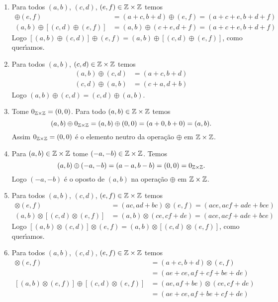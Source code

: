 \documentclass[12pt]{article}
\begin{document}
	\begin{enumerate}[label={\roman*})]
		\item Para todos $(a, b)$, $(c, d)$, $(e, f) \in \mathbb{Z} \times \mathbb{Z}$ temos
		\begin{align*}
			[(a, b) \oplus (c, d)] \oplus (e, f) &= (a + c, b + d) \oplus (e, f) = (a + c + e, b + d + f)\\
			(a, b) \oplus [(c, d) \oplus (e, f)] &= (a, b) \oplus (c + e, d + f) = (a + c + e, b + d + f)
		\end{align*}
		Logo $[(a, b) \oplus (c, d)] \oplus (e, f) = (a, b) \oplus [(c, d) \oplus (e, f)]$, como quer{\'\i}amos.

		\item Para todos $(a, b)$, $(c, d) \in \mathbb{Z} \times \mathbb{Z}$ temos
		\begin{align*}
			(a, b) \oplus (c, d) &= (a + c, b + d)\\
			(c, d) \oplus (a, b) &= (c + a, d + b)
		\end{align*}
		Logo $(a, b) \oplus (c, d) = (c, d) \oplus (a, b)$.

		\item Tome $0_{\mathbb{Z} \times \mathbb{Z}} = (0, 0)$. Para todo $(a, b) \in \mathbb{Z} \times \mathbb{Z}$ temos
		\[
			(a, b) \oplus 0_{\mathbb{Z} \times \mathbb{Z}} = (a, b) \oplus (0, 0) = (a + 0, b + 0) = (a, b).
		\]
		Assim $0_{\mathbb{Z} \times \mathbb{Z}} = (0, 0)$ \'e o elemento neutro da opera\c{c}\~ao $\oplus$ em $\mathbb{Z} \times \mathbb{Z}$.

		\item Para $(a, b) \in \mathbb{Z} \times \mathbb{Z}$ tome $(-a, -b) \in \mathbb{Z} \times \mathbb{Z}$. Temos
		\[
			(a, b) \oplus (-a, -b) = (a - a, b - b) = (0, 0) = 0_{\mathbb{Z} \times \mathbb{Z}}.
		\]
		Logo $(-a, -b)$ \'e o oposto de $(a, b)$ na opera\c{c}\~ao $\oplus$ em $\mathbb{Z} \times \mathbb{Z}$.

		\item Para todos $(a, b)$, $(c, d)$, $(e, f) \in \mathbb{Z} \times \mathbb{Z}$ temos
		\begin{align*}
			[(a, b) \otimes (c, d)] \otimes (e, f) &= (ac, ad + bc) \otimes (e, f) = (ace, acf + ade + bce)\\
			(a, b) \otimes [(c, d) \otimes (e, f)] &= (a, b) \otimes (ce, cf + de) = (ace, acf + ade + bce)
		\end{align*}
		Logo $[(a, b) \otimes (c, d)] \otimes (e, f) = (a, b) \otimes [(c, d) \otimes (e, f)]$, como quer{\'\i}amos.

		\item Para todos $(a, b)$, $(c, d)$, $(e, f) \in \mathbb{Z} \times \mathbb{Z}$ temos
		\begin{align*}
			[(a, b) \oplus (c, d)] \otimes (e, f) &= (a + c, b + d) \otimes (e, f) \\& = (ae + ce, af + cf + be + de)\\
			[(a, b) \otimes (e, f)] \oplus [(c, d) \otimes (e, f)] &= (ae, af + be) \otimes (ce, cf + de) \\ &= (ae + ce, af + be + cf + de)
		\end{align*}


\end{enumerate}
\end{document}
